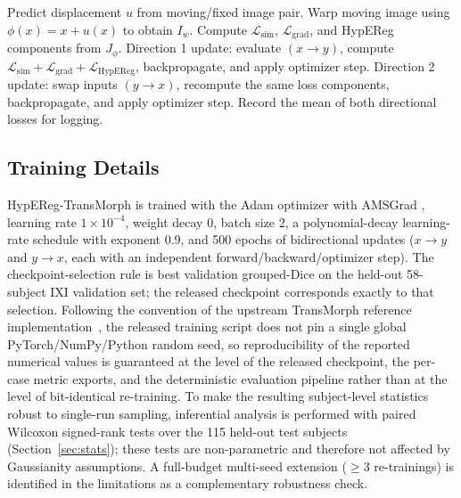 \documentclass[jimaging,article,submit,pdftex,moreauthors]{Definitions/mdpi}
\begin{document}
\begin{algorithm}[H]
\caption{HypEReg-TransMorph training step (per mini-batch)}
\begin{algorithmic}[1]
\State Predict displacement $u$ from moving/fixed image pair.
\State Warp moving image using $\phi(x)=x+u(x)$ to obtain $I_w$.
\State Compute $\mathcal{L}_{\mathrm{sim}}$, $\mathcal{L}_{\mathrm{grad}}$, and HypEReg components from $J_\phi$.
\State Direction 1 update: evaluate $(x\rightarrow y)$, compute $\mathcal{L}_{\mathrm{sim}}+\mathcal{L}_{\mathrm{grad}}+\mathcal{L}_{\mathrm{HypEReg}}$, backpropagate, and apply optimizer step.
\State Direction 2 update: swap inputs $(y\rightarrow x)$, recompute the same loss components, backpropagate, and apply optimizer step.
\State Record the mean of both directional losses for logging.
\end{algorithmic}
\end{algorithm}

\subsection{Training Details}
HypEReg-TransMorph is trained with the Adam optimizer with AMSGrad \cite{kingma2014adam,reddi2018amsgrad}, learning rate \(1\times10^{-4}\), weight decay 0, batch size 2, a polynomial-decay learning-rate schedule with exponent 0.9, and 500 epochs of bidirectional updates (\(x\rightarrow y\) and \(y\rightarrow x\), each with an independent forward/backward/optimizer step). The checkpoint-selection rule is best validation grouped-Dice on the held-out 58-subject IXI validation set; the released checkpoint corresponds exactly to that selection. Following the convention of the upstream TransMorph reference implementation~\cite{chen2022transmorph}, the released training script does not pin a single global PyTorch/NumPy/Python random seed, so reproducibility of the reported numerical values is guaranteed at the level of the released checkpoint, the per-case metric exports, and the deterministic evaluation pipeline rather than at the level of bit-identical re-training. To make the resulting subject-level statistics robust to single-run sampling, inferential analysis is performed with paired Wilcoxon signed-rank tests over the 115 held-out test subjects (Section~\ref{sec:stats}); these tests are non-parametric and therefore not affected by Gaussianity assumptions. A full-budget multi-seed extension (\(\geq 3\) re-trainings) is identified in the limitations as a complementary robustness check.
\end{document}
